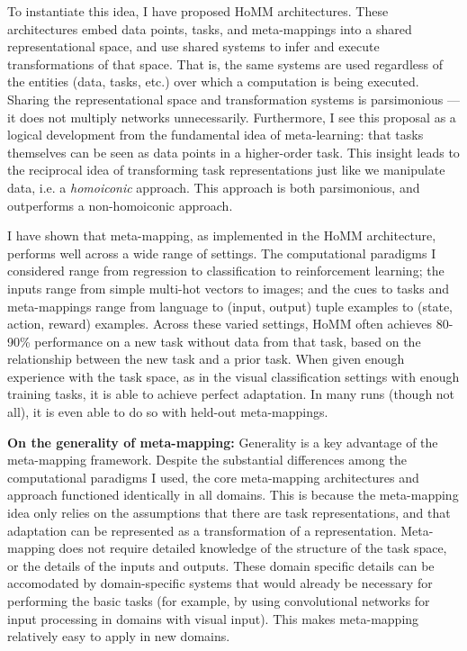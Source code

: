 To instantiate this idea, I have proposed HoMM architectures. These architectures embed data points, tasks, and meta-mappings into a shared representational space, and use shared systems to infer and execute transformations of that space. That is, the same systems are used regardless of the entities (data, tasks, etc.) over which a computation is being executed. Sharing the representational space and transformation systems is parsimonious --- it does not multiply networks unnecessarily. Furthermore, I see this proposal as a logical development from the fundamental idea of meta-learning: that tasks themselves can be seen as data points in a higher-order task. This insight leads to the reciprocal idea of transforming task representations just like we manipulate data, i.e. a \emph{homoiconic} approach. This approach is both parsimonious, and outperforms a non-homoiconic approach.\par  

I have shown that meta-mapping, as implemented in the HoMM architecture, performs well across a wide range of settings. The computational paradigms I considered range from regression to classification to reinforcement learning; the inputs range from simple multi-hot vectors to images; and the cues to tasks and meta-mappings range from language to (input, output) tuple examples to (state, action, reward) examples. Across these varied settings, HoMM often achieves 80-90\% performance on a new task without data from that task, based on the relationship between the new task and a prior task. When given enough experience with the task space, as in the visual classification settings with enough training tasks, it is able to achieve perfect adaptation. In many runs (though not all), it is even able to do so with held-out meta-mappings. \par

\textbf{On the generality of meta-mapping:} Generality is a key advantage of the meta-mapping framework. Despite the substantial differences among the computational paradigms I used, the core meta-mapping architectures and approach functioned identically in all domains. This is because the meta-mapping idea only relies on the assumptions that there are task representations, and that adaptation can be represented as a transformation of a representation. Meta-mapping does not require detailed knowledge of the structure of the task space, or the details of the inputs and outputs. These domain specific details can be accomodated by domain-specific systems that would already be necessary for performing the basic tasks (for example, by using convolutional networks for input processing in domains with visual input). This makes meta-mapping relatively easy to apply in new domains. \par 


